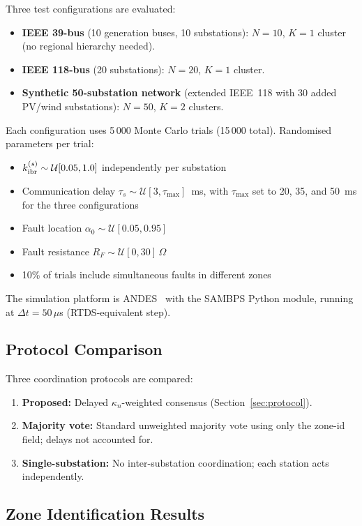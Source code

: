 \documentclass[journal]{IEEEtran}
\newcommand{\kibr}{k_{\rm ibr}}
\newcommand{\kappan}{\kappa_n}
\newcommand{\taumax}{\tau_{\max}}
\begin{document}
Three test configurations are evaluated:
\begin{itemize}
  \item \textbf{IEEE 39-bus} (10 generation buses, 10 substations):
        $N = 10$, $K = 1$ cluster (no regional hierarchy needed).
  \item \textbf{IEEE 118-bus} (20 substations): $N = 20$, $K = 1$
        cluster.
  \item \textbf{Synthetic 50-substation network} (extended IEEE~118
        with 30 added PV/wind substations): $N = 50$, $K = 2$
        clusters.
\end{itemize}
Each configuration uses 5\,000 Monte Carlo trials (15\,000 total).
Randomised parameters per trial:
\begin{itemize}
  \item $\kibr^{(s)} \sim \mathcal{U}[0.05, 1.0]$ independently per substation
  \item Communication delay $\tau_s \sim \mathcal{U}[3, \taumax]$~ms, with
        $\taumax$ set to 20, 35, and 50~ms for the three configurations
  \item Fault location $\alpha_0 \sim \mathcal{U}[0.05, 0.95]$
  \item Fault resistance $R_F \sim \mathcal{U}[0, 30]\,\Omega$
  \item 10\% of trials include simultaneous faults in different zones
\end{itemize}
The simulation platform is ANDES~\cite{Cui2021} with the SAMBPS Python
module, running at $\Delta t = 50\,\mu$s (RTDS-equivalent step).

\subsection{Protocol Comparison}

Three coordination protocols are compared:
\begin{enumerate}
  \item \textbf{Proposed:} Delayed $\kappan$-weighted consensus
        (Section~\ref{sec:protocol}).
  \item \textbf{Majority vote:} Standard unweighted majority vote using
        only the zone-id field; delays not accounted for.
  \item \textbf{Single-substation:} No inter-substation coordination;
        each station acts independently.
\end{enumerate}

\subsection{Zone Identification Results}
\end{document}
